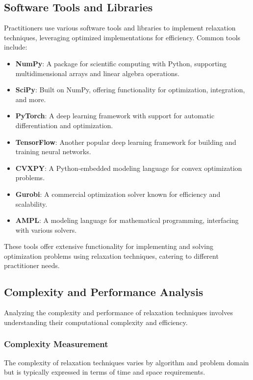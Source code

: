 \documentclass[12pt]{book} %
\begin{document}
\subsection{Software Tools and Libraries}

Practitioners use various software tools and libraries to implement relaxation techniques, leveraging optimized implementations for efficiency. Common tools include:

\begin{itemize}
    \item \textbf{NumPy}: A package for scientific computing with Python, supporting multidimensional arrays and linear algebra operations.
    \item \textbf{SciPy}: Built on NumPy, offering functionality for optimization, integration, and more.
    \item \textbf{PyTorch}: A deep learning framework with support for automatic differentiation and optimization.
    \item \textbf{TensorFlow}: Another popular deep learning framework for building and training neural networks.
    \item \textbf{CVXPY}: A Python-embedded modeling language for convex optimization problems.
    \item \textbf{Gurobi}: A commercial optimization solver known for efficiency and scalability.
    \item \textbf{AMPL}: A modeling language for mathematical programming, interfacing with various solvers.
\end{itemize}

These tools offer extensive functionality for implementing and solving optimization problems using relaxation techniques, catering to different practitioner needs.

\subsection{Complexity and Performance Analysis}

Analyzing the complexity and performance of relaxation techniques involves understanding their computational complexity and efficiency.

\subsubsection{Complexity Measurement}

The complexity of relaxation techniques varies by algorithm and problem domain but is typically expressed in terms of time and space requirements.
\end{document}
